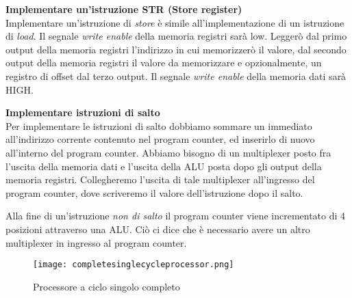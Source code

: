 \begin{defn}
\textbf{Implementare un'istruzione STR (Store register)} \\
Implementare un'istruzione di \textit{store} è simile all'implementazione di un istruzione di \textit{load}.
Il segnale \textit{write enable} della memoria registri sarà low. Leggerò dal primo output della memoria registri l'indirizzo in cui memorizzerò il valore,
dal secondo output della memoria registri il valore da memorizzare e opzionalmente, un registro di offset dal terzo output.
Il segnale \textit{write enable} della memoria dati sarà HIGH.
\end{defn}

\begin{defn}
\textbf{Implementare istruzioni di salto} \\
Per implementare le istruzioni di salto dobbiamo sommare un immediato
all'indirizzo corrente contenuto nel program counter, ed inserirlo di nuovo all'interno del program counter.
Abbiamo bisogno di un multiplexer posto fra l'uscita della memoria dati e l'uscita della ALU posta dopo gli output della memoria registri.
Collegheremo l'uscita di tale multiplexer all'ingresso del program counter, dove scriveremo il valore dell'istruzione dopo il salto.

Alla fine di un'istruzione \textit{non di salto} il program counter viene incrementato di 4 posizioni attraverso una ALU.
Ciò ci dice che è necessario avere un altro multiplexer in ingresso al program counter.
\end{defn}


\begin{figure}[htbp]
    \centering
    \texttt{[image: completesinglecycleprocessor.png]}
    \caption{Processore a ciclo singolo completo}
    \label{<label>}
\end{figure}